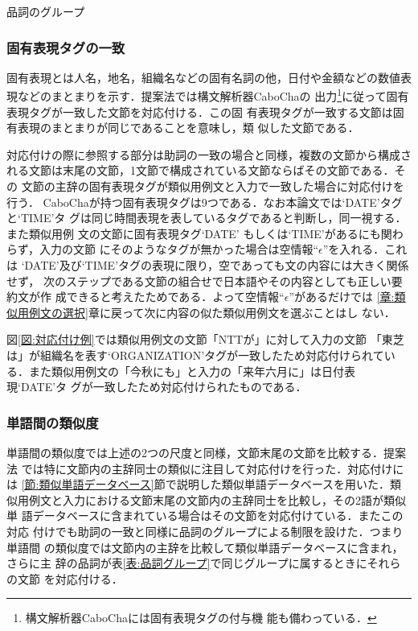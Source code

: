 \documentclass[japanese]{jnlp_1.4}
\begin{document}
\begin{table}[b]
\caption{品詞のグループ} \label{表:品詞グループ}

\end{table}




\subsubsection{固有表現タグの一致}\label{節:固有表現タグの一致}

固有表現とは人名，地名，組織名などの固有名詞の他，日付や金額などの数値表
現などのまとまりを示す．提案法では構文解析器CaboChaの
出力\footnote {構文解析器CaboChaには固有表現タグの付与機
能も備わっている．}に従って固有表現タグが一致した文節を対応付ける．この固
有表現タグが一致する文節は固有表現のまとまりが同じであることを意味し，類
似した文節である．

対応付けの際に参照する部分は助詞の一致の場合と同様，複数の文節から構成さ
れる文節は末尾の文節，1文節で構成されている文節ならばその文節である．その
文節の主辞の固有表現タグが類似用例文と入力で一致した場合に対応付けを行う．
CaboChaが持つ固有表現タグは9つである．なお本論文では`DATE'タグと`TIME'タ
グは同じ時間表現を表しているタグであると判断し，同一視する．また類似用例
文の文節に固有表現タグ`DATE' もしくは`TIME'があるにも関わらず，入力の文節
にそのようなタグが無かった場合は空情報``$\epsilon$''を入れる．これは
`DATE'及び`TIME'タグの表現に限り，空であっても文の内容には大きく関係せず，
次のステップである文節の組合せで日本語やその内容としても正しい要約文が作
成できると考えたためである．よって空情報``$\epsilon$''があるだけでは
\ref{章:類似用例文の選択}章に戻って次に内容の似た類似用例文を選ぶことはし
ない．


図\ref{図:対応付け例}では類似用例文の文節「NTTが」に対して入力の文節
「東芝は」が組織名を表す`ORGANIZATION'タグが一致したため対応付けられてい
る．また類似用例文の「今秋にも」と入力の「来年六月に」は日付表現`DATE'タ
グが一致したため対応付けられたものである．

\subsubsection{単語間の類似度}\label{節:単語間の類似度}

単語間の類似度では上述の2つの尺度と同様，文節末尾の文節を比較する．提案法
では特に文節内の主辞同士の類似に注目して対応付けを行った．対応付けには
\ref{節:類似単語データベース}節で説明した類似単語データベースを用いた．類
似用例文と入力における文節末尾の文節内の主辞同士を比較し，その2語が類似単
語データベースに含まれている場合はその文節を対応付けている．またこの対応
付けでも助詞の一致と同様に品詞のグループによる制限を設けた．つまり単語間
の類似度では文節内の主辞を比較して類似単語データベースに含まれ，さらに主
辞の品詞が表\ref{表:品詞グループ}で同じグループに属するときにそれらの文節
を対応付ける．
\end{document}
